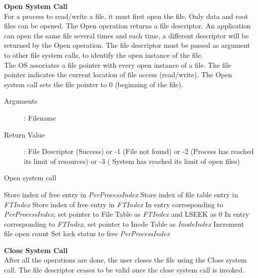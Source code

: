 \documentclass[10pt]{article}
\begin{document}
\textbf{Open System Call}
\vspace{3mm}\\
For a process to read/write a file, it must first open the file. Only data and root files can be opened. The Open operation returns a file descriptor. An application can open the same file several times and each time, a different descriptor will be returned by the Open operation. The file descriptor must be passed as argument to other file system calls, to identify the open instance of the file.
\vspace{2mm}\\
The OS associates a file pointer with every open instance of a file. The file pointer indicates the current location of file access (read/write). The Open system call sets the file pointer to 0 (beginning of the file).
\vspace{2mm}
\begin{description}
	\item[Arguments]: Filename
	\item[Return Value]: File Descriptor (Success) or -1 (File not found) or -2 (Process has reached its limit of resources) or -3 ( 	System has reached its limit of open files)
\end{description} 
\begin{algorithm}
\caption{Open system call}
\begin{algorithmic}
\ENDIF
{}
\ENDIF
{}
\ELSE
    \STATE Store index of free entry in \textit{PerProcessIndex}
\ENDIF    
{}
    \STATE Store index of file table entry in \textit{FTIndex}
\ELSE
    \ELSE 
        \STATE Store index of free entry in \textit{FTIndex}
    \ENDIF
\ENDIF
\STATE In entry corresponding to \textit{PerProcessIndex}, set pointer to File Table as \textit{FTIndex} and LSEEK as 0
\STATE In entry corresponding to \textit{FTIndex}, set pointer to Inode Table as \textit{InodeIndex} 
\STATE Increment file open count
\STATE Set lock status to free
\RETURN \textit{PerProcessIndex} 
\end{algorithmic}
\end{algorithm}
\vspace{5mm}
\textbf{Close System Call}
\vspace{2mm}\\
 After all the operations are done, the user closes the file using the Close system call. The file descriptor ceases to be valid once the close system call is invoked. 
\end{document}
